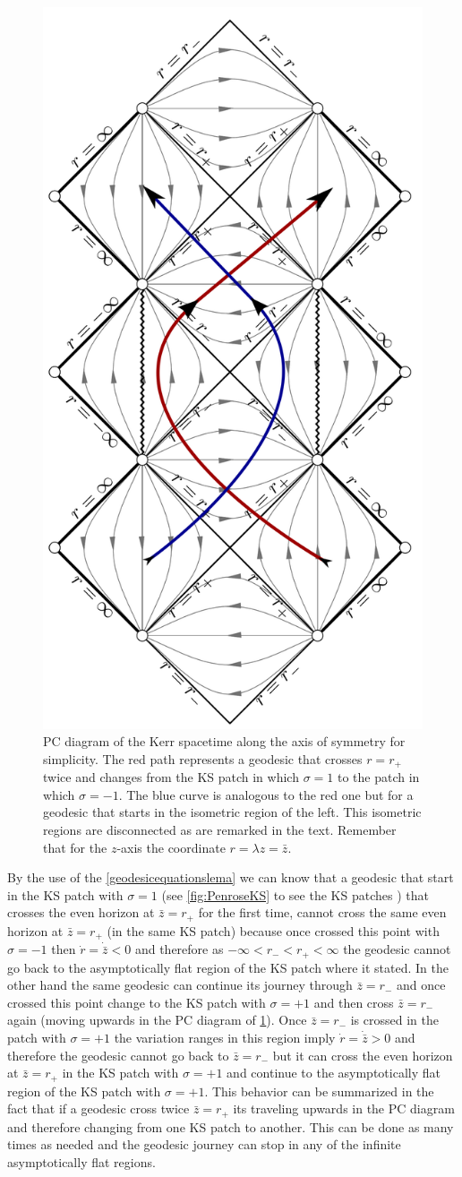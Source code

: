  \begin{figure}[htp!]
\begin{center}
 \centerline{\includegraphics[width=.38\textwidth]{img/Chapter3/Diagrama2.png}}
 \end{center}
 \caption{\gls{PC} diagram of the Kerr spacetime along the axis of symmetry for simplicity. The red path represents a geodesic that crosses $r=r_+$ twice and changes from the \gls{KS} patch in which $\sigma=1$ to the patch in which $\sigma=-1$. The blue curve is analogous to the red one but for a geodesic that starts in the isometric region of the left. This isometric regions are disconnected as are remarked in the text. Remember that for the $z$-axis the coordinate $r=\lambda z= \bar z$.}
 \label{fig:Penrose2}
\end{figure} 
\FloatBarrier

By the use of the \cref{geodesicequationslema} we can know that a geodesic that start in the \gls{KS} patch with $\sigma=1$ (see \vref{fig:PenroseKS} to see the \gls{KS} patches ) that crosses the even horizon at $\bar z=r_+$ for the first time, cannot cross the same even horizon at $\bar z=r_+$ (in the same \gls{KS} patch) because once crossed this point with $\sigma=-1$ then $\dot{r}=\dot{ \bar z} <0$ and therefore as $-\infty < r_- <r_+ < \infty$ the geodesic cannot go back to the asymptotically flat region of the \gls{KS} patch where it stated. In the other hand the same geodesic can continue its journey through $\bar z=r_-$ and once crossed this point change to the \gls{KS} patch with $\sigma=+1$ and then cross $\bar z=r_-$ again (moving upwards in the \gls{PC} diagram of \cref{fig:Penrose2}). Once $\bar z=r_-$ is crossed in the patch with $\sigma=+1$ the variation ranges in this region imply $\dot{r}=\dot{\bar z} >0$ and therefore the geodesic cannot go back to $\bar z=r_-$ but it can cross the even horizon at $\bar z=r_+$ in the \gls{KS} patch with $\sigma=+1$ and continue to the asymptotically flat region of the \gls{KS} patch with $\sigma=+1$. This behavior can be summarized in the fact that if a geodesic cross twice $\bar z=r_+$ its traveling upwards in the \gls{PC} diagram and therefore changing from one \gls{KS} patch to another. This can be done as many times as needed and the geodesic journey can stop in any of the infinite asymptotically flat regions.

